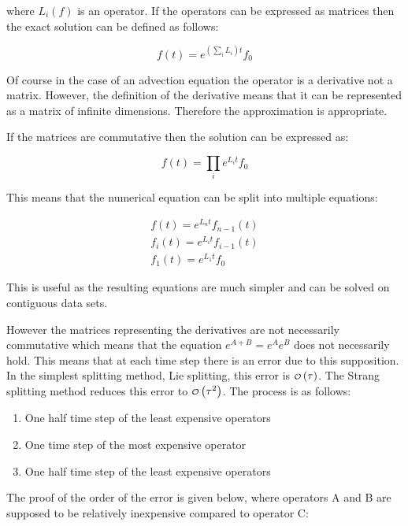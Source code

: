 where $L_i(f)$ is an operator. If the operators can be expressed as matrices then the exact solution can be defined as follows:

\begin{equation}
 f(t) = e^{(\sum_i L_i)t}f_0
\end{equation}

Of course in the case of an advection equation the operator is a derivative not a matrix. However, the definition of the derivative means that it can be represented as a matrix of infinite dimensions. Therefore the approximation is appropriate.

If the matrices are commutative then the solution can be expressed as:

\begin{equation}
 f(t) = \prod_i e^{L_it}f_0
\end{equation}

This means that the numerical equation can be split into multiple equations:

\begin{align}
 f(t) = e^{L_n t} f_{n-1}(t)\\
 f_i(t) = e^{L_i t} f_{i-1}(t)\\
 f_1(t) = e^{L_1 t} f_0
\end{align}

This is useful as the resulting equations are much simpler and can be solved on contiguous data sets.

However the matrices representing the derivatives are not necessarily commutative which means that the equation $e^{A+B}=e^Ae^B$ does not necessarily hold. This means that at each time step there is an error due to this supposition. In the simplest splitting method, Lie splitting, this error is $\o{\tau}$. The Strang splitting method reduces this error to $\o{\tau^2}$. The process is as follows:

\begin{enumerate}
 \item One half time step of the least expensive operators
 \item One time step of the most expensive operator
 \item One half time step of the least expensive operators
\end{enumerate}

The proof of the order of the error is given below, where operators A and B are supposed to be relatively inexpensive compared to operator C:

